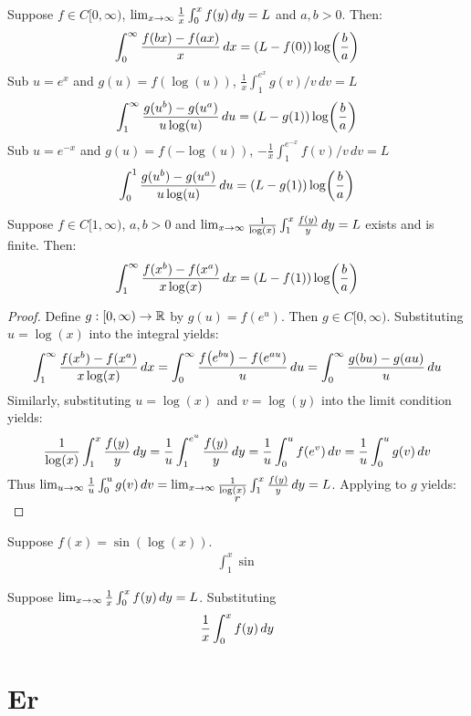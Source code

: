 \documentclass[main.tex]{subfiles}
\begin{document}
\begin{theorem}
    Suppose $f\in C[0,\infty)$, $\lim_{x\to\infty} \frac{1}{x}\int_0^x f(y)\,dy=L$ and $a,b>0$. Then:
    \begin{equation*}
        \int_0^\infty \frac{f(bx)-f(ax)}{x}\,dx=\qty(L-f(0))\log(\frac{b}{a})
    \end{equation*}
    Sub $u=e^x$ and $g(u)=f(\log(u))$, $\frac{1}{x}\int_1^{e^x} g(v)/v\,dv=L$
    \begin{equation*}
        \int_1^\infty \frac{g(u^b)-g(u^a)}{u\log(u)}\,du=\qty(L-g(1))\log(\frac{b}{a})
    \end{equation*}
    Sub $u=e^{-x}$ and $g(u)=f(-\log(u))$, $-\frac{1}{x}\int_1^{e^{-x}} f(v)/v\,dv=L$
    \begin{equation*}
        \int_0^1 \frac{g(u^b)-g(u^a)}{u\log(u)}\,du=\qty(L-g(1))\log(\frac{b}{a})
    \end{equation*}
\end{theorem}

\begin{corollary}
    Suppose $f\in C[1,\infty)$, $a,b>0$ and $\lim_{x\to\infty} \frac{1}{\log(x)}\int_1^x \frac{f(y)}{y}\,dy=L$ exists and is finite. Then:
    \begin{equation*}
        \int_1^\infty \frac{f(x^b)-f(x^a)}{x\log(x)}\,dx=\qty(L-f(1))\log(\frac{b}{a})
    \end{equation*}
\end{corollary}
\begin{proof}
    Define $g:[0,\infty)\to\R$ by $g(u)=f(e^u)$. Then $g\in C[0,\infty)$. Substituting $u=\log(x)$ into the integral yields:
    \begin{equation*}
        \int_1^\infty \frac{f(x^b)-f(x^a)}{x\log(x)}\,dx
        = \int_0^\infty \frac{f\qty(e^{bu})-f\qty(e^{au})}{u}\,du
        = \int_0^\infty \frac{g(bu)-g(au)}{u}\,du
    \end{equation*}
    Similarly, substituting $u=\log(x)$ and $v=\log(y)$ into the limit condition yields:
    \begin{equation*}
        \frac{1}{\log(x)}\int_1^x \frac{f(y)}{y}\,dy
        = \frac{1}{u}\int_1^{e^u} \frac{f(y)}{y}\,dy
        = \frac{1}{u}\int_0^u f\qty(e^v)\,dv
        = \frac{1}{u}\int_0^u g(v)\,dv
    \end{equation*}
    Thus $\lim_{u\to\infty} \frac{1}{u}\int_0^u g(v)\,dv=\lim_{x\to\infty} \frac{1}{\log(x)}\int_1^x \frac{f(y)}{y}\,dy=L$. Applying  to $g$ yields:
    \begin{equation*}
        r
    \end{equation*}
\end{proof}

Suppose $f(x)=\sin(\log(x))$.
\begin{align*}
    \int_1^x \sin
\end{align*}

Suppose $\lim_{x\to\infty} \frac{1}{x}\int_0^x f(y)\,dy=L$. Substituting
\begin{align*}
    \frac{1}{x}\int_0^x f(y)\,dy
\end{align*}

\appendix
\section{Er}

\begin{proposition}

\end{proposition}
\end{document}

